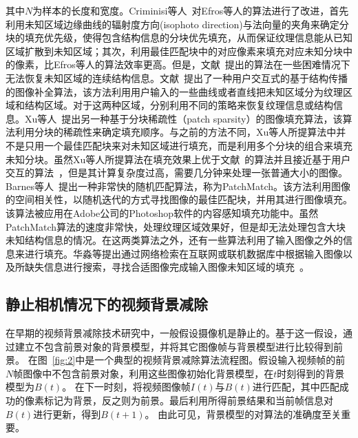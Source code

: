其中$N$为样本的长度和宽度。Criminisi等人~\cite{Criminisi04regionfilling}对Efros等人的算法进行了改进，首先利用未知区域边缘曲线的辐射度方向(isophoto direction)与法向量的夹角来确定分块的填充优先级，使得包含结构信息的分块优先填充，从而保证纹理信息能从已知区域扩散到未知区域；其次，利用最佳匹配块中的对应像素来填充对应未知分块中的像素，比Efros等人的算法效率更高。但是，文献~提出的算法在一些困难情况下无法恢复未知区域的连续结构信息。文献~提出了一种用户交互式的基于结构传播的图像补全算法，该方法利用用户输入的一些曲线或者直线把未知区域分为纹理区域和结构区域。对于这两种区域，分别利用不同的策略来恢复纹理信息或结构信息。Xu等人~\cite{Xu:2010}提出另一种基于分块稀疏性（patch sparsity）的图像填充算法，该算法利用分块的稀疏性来确定填充顺序。与之前的方法不同，Xu等人所提算法中并不是只用一个最佳匹配块来对未知区域进行填充，而是利用多个分块的组合来填充未知分块。虽然Xu等人所提算法在填充效果上优于文献~的算法并且接近基于用户交互的算法~\cite{userInpainting}，但是其计算复杂度过高，需要几分钟来处理一张普通大小的图像。Barnes等人~\cite{Barnes:2009}提出一种非常快的随机匹配算法，称为PatchMatch。该方法利用图像的空间相关性，以随机迭代的方式寻找图像的最佳匹配块，并用其进行图像填充。该算法被应用在Adobe公司的Photoshop软件的内容感知填充功能中。虽然PatchMatch算法的速度非常快，处理纹理区域效果好，但是却无法处理包含大块未知结构信息的情况。在这两类算法之外，还有一些算法利用了输入图像之外的信息来进行填充。华淼等提出通过网络检索在互联网或联机数据库中根据输入图像以及所缺失信息进行搜索，寻找合适图像完成输入图像未知区域的填充~\cite{huamiao}。


\subsection{静止相机情况下的视频背景减除}
\label{sec:staticCamera}
在早期的视频背景减除技术研究中，一般假设摄像机是静止的。基于这一假设，通过建立不包含前景对象的背景模型，并将其它图像帧与背景模型进行比较得到前景。
在图~\ref{fig:2}中是一个典型的视频背景减除算法流程图。假设输入视频帧的前$N$帧图像中不包含前景对象，利用这些图像初始化背景模型，在$t$时刻得到的背景模型为$B(t)$。
在下一时刻，将视频图像帧$I(t)$与$B(t)$进行匹配，其中匹配成功的像素标记为背景，反之则为前景。最后利用所得前景结果和当前帧信息对$B(t)$进行更新，得到$B(t+1)$。
由此可见，背景模型的对算法的准确度至关重要。

